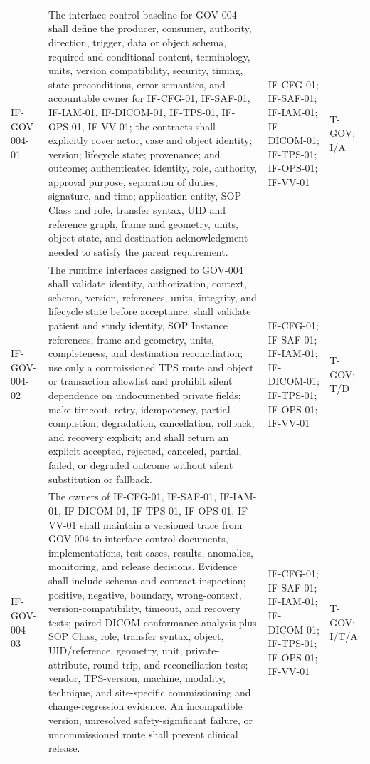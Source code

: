 \documentclass[11pt,letterpaper]{article}
\begin{document}
\begin{scriptsize}
\begin{longtable}{@{}L{0.14\textwidth}L{0.49\textwidth}L{0.19\textwidth}L{0.10\textwidth}@{}}
\addlinespace[2pt]
\mbox{IF-GOV-004-01} & The interface-control baseline for GOV-004 shall define the producer, consumer, authority, direction, trigger, data or object schema, required and conditional content, terminology, units, version compatibility, security, timing, state preconditions, error semantics, and accountable owner for IF-CFG-01, IF-SAF-01, IF-IAM-01, IF-DICOM-01, IF-TPS-01, IF-OPS-01, IF-VV-01; the contracts shall explicitly cover actor, case and object identity; version; lifecycle state; provenance; and outcome; authenticated identity, role, authority, approval purpose, separation of duties, signature, and time; application entity, SOP Class and role, transfer syntax, UID and reference graph, frame and geometry, units, object state, and destination acknowledgment needed to satisfy the parent requirement. & IF-CFG-01; IF-SAF-01; IF-IAM-01; IF-DICOM-01; IF-TPS-01; IF-OPS-01; IF-VV-01 & T-GOV; I\slash\allowbreak{}A \\
\addlinespace[2pt]
\mbox{IF-GOV-004-02} & The runtime interfaces assigned to GOV-004 shall validate identity, authorization, context, schema, version, references, units, integrity, and lifecycle state before acceptance; shall validate patient and study identity, SOP Instance references, frame and geometry, units, completeness, and destination reconciliation; use only a commissioned TPS route and object or transaction allowlist and prohibit silent dependence on undocumented private fields; make timeout, retry, idempotency, partial completion, degradation, cancellation, rollback, and recovery explicit; and shall return an explicit accepted, rejected, canceled, partial, failed, or degraded outcome without silent substitution or fallback. & IF-CFG-01; IF-SAF-01; IF-IAM-01; IF-DICOM-01; IF-TPS-01; IF-OPS-01; IF-VV-01 & T-GOV; T\slash\allowbreak{}D \\
\addlinespace[2pt]
\mbox{IF-GOV-004-03} & The owners of IF-CFG-01, IF-SAF-01, IF-IAM-01, IF-DICOM-01, IF-TPS-01, IF-OPS-01, IF-VV-01 shall maintain a versioned trace from GOV-004 to interface-control documents, implementations, test cases, results, anomalies, monitoring, and release decisions. Evidence shall include schema and contract inspection; positive, negative, boundary, wrong-context, version-compatibility, timeout, and recovery tests; paired DICOM conformance analysis plus SOP Class, role, transfer syntax, object, UID\slash\allowbreak{}reference, geometry, unit, private-attribute, round-trip, and reconciliation tests; vendor, TPS-version, machine, modality, technique, and site-specific commissioning and change-regression evidence. An incompatible version, unresolved safety-significant failure, or uncommissioned route shall prevent clinical release. & IF-CFG-01; IF-SAF-01; IF-IAM-01; IF-DICOM-01; IF-TPS-01; IF-OPS-01; IF-VV-01 & T-GOV; I\slash\allowbreak{}T\slash\allowbreak{}A \\

\end{longtable}
\end{scriptsize}
\end{document}
